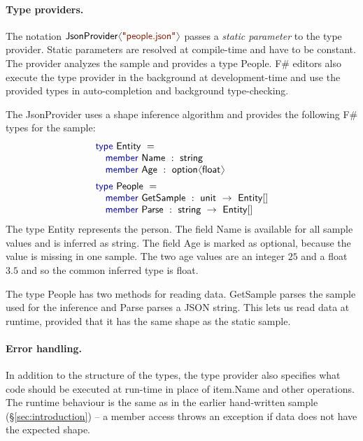 \documentclass[10pt,preprint,blind,clearpagebib]{sigplanconf}
\newcommand{\langl}{\begin{picture}(4.5,7)
\put(1.1,2.5){\rotatebox{60}{\line(1,0){5.5}}}
\put(1.1,2.5){\rotatebox{300}{\line(1,0){5.5}}}
\end{picture}}
\newcommand{\rangl}{\begin{picture}(4.5,7)
\put(.9,2.5){\rotatebox{120}{\line(1,0){5.5}}}
\put(.9,2.5){\rotatebox{240}{\line(1,0){5.5}}}
\end{picture}}
\newcommand{\kvd}[1]{\textnormal{\textcolor{kvdclr}{\sffamily #1}}}
\newcommand{\str}[1]{\textnormal{\textcolor{strclr}{\sffamily "#1"}}}
\newcommand{\ident}[1]{\textnormal{\sffamily #1}}
\begin{document}
\paragraph{Type providers.}
The notation $\ident{JsonProvider}\langl\str{people.json}\rangl$ passes a \emph{static parameter} 
to the type provider. Static parameters are resolved at compile-time and have to be constant. 
The provider analyzes the sample and provides a type  \ident{People}. F\# editors also 
execute the type provider in the background at development-time and use the provided types 
in auto-completion and background type-checking.

The \ident{JsonProvider} uses a shape inference algorithm and provides
the following F\# types for the sample:
%
\begin{equation*}
\begin{array}{l}
 \kvd{type}~\ident{Entity}~=  \\
 \quad \kvd{member}~\ident{Name}~:~\ident{string} \\
 \quad \kvd{member}~\ident{Age}~:~\ident{option}\langl \ident{float}\rangl \\[0.5em]
 \kvd{type}~\ident{People}~=  \\
 \quad \kvd{member}~\ident{GetSample}~:~\ident{unit}~\rightarrow~\ident{Entity}[] \\
 \quad \kvd{member}~\ident{Parse}~:~\ident{string}~\rightarrow~\ident{Entity}[] \\
\end{array}
\end{equation*}
%
The type \ident{Entity} represents the person. The field \ident{Name} is available for all
sample values and is inferred as \ident{string}. The field \ident{Age} is marked as optional,
because the value is missing in one sample. The two age values are an integer $25$ and a 
float $3.5$ and so the common inferred type is \ident{float}.

The type \ident{People} has two methods for reading data. \ident{GetSample} parses the
sample used for the inference and \ident{Parse} parses a JSON string. This lets us read
data at runtime, provided that it has the same shape as the static sample.

\paragraph{Error handling.}
In addition to the structure of the types, the type provider also specifies what code should be 
executed at run-time in place of \ident{item.Name} and other operations. The runtime behaviour is 
the same as in the earlier hand-written sample (\S\ref{sec:introduction}) -- a member access 
throws an exception if data does not have the expected shape.
\end{document}
